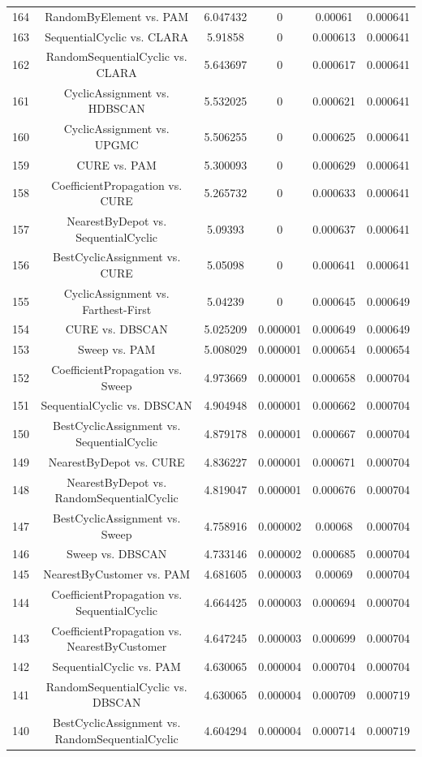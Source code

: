 \documentclass[a4paper,10pt]{article}
\begin{document}
\begin{landscape}
\begin{table}[!htp]
\begin{tabular}{cccccc}
164&RandomByElement vs. PAM&6.047432&0&0.00061&0.000641\\
163&SequentialCyclic vs. CLARA&5.91858&0&0.000613&0.000641\\
162&RandomSequentialCyclic vs. CLARA&5.643697&0&0.000617&0.000641\\
161&CyclicAssignment vs. HDBSCAN&5.532025&0&0.000621&0.000641\\
160&CyclicAssignment vs. UPGMC&5.506255&0&0.000625&0.000641\\
159&CURE vs. PAM&5.300093&0&0.000629&0.000641\\
158&CoefficientPropagation vs. CURE&5.265732&0&0.000633&0.000641\\
157&NearestByDepot vs. SequentialCyclic&5.09393&0&0.000637&0.000641\\
156&BestCyclicAssignment vs. CURE&5.05098&0&0.000641&0.000641\\
155&CyclicAssignment vs. Farthest-First&5.04239&0&0.000645&0.000649\\
154&CURE vs. DBSCAN&5.025209&0.000001&0.000649&0.000649\\
153&Sweep vs. PAM&5.008029&0.000001&0.000654&0.000654\\
152&CoefficientPropagation vs. Sweep&4.973669&0.000001&0.000658&0.000704\\
151&SequentialCyclic vs. DBSCAN&4.904948&0.000001&0.000662&0.000704\\
150&BestCyclicAssignment vs. SequentialCyclic&4.879178&0.000001&0.000667&0.000704\\
149&NearestByDepot vs. CURE&4.836227&0.000001&0.000671&0.000704\\
148&NearestByDepot vs. RandomSequentialCyclic&4.819047&0.000001&0.000676&0.000704\\
147&BestCyclicAssignment vs. Sweep&4.758916&0.000002&0.00068&0.000704\\
146&Sweep vs. DBSCAN&4.733146&0.000002&0.000685&0.000704\\
145&NearestByCustomer vs. PAM&4.681605&0.000003&0.00069&0.000704\\
144&CoefficientPropagation vs. SequentialCyclic&4.664425&0.000003&0.000694&0.000704\\
143&CoefficientPropagation vs. NearestByCustomer&4.647245&0.000003&0.000699&0.000704\\
142&SequentialCyclic vs. PAM&4.630065&0.000004&0.000704&0.000704\\
141&RandomSequentialCyclic vs. DBSCAN&4.630065&0.000004&0.000709&0.000719\\
140&BestCyclicAssignment vs. RandomSequentialCyclic&4.604294&0.000004&0.000714&0.000719\\

\end{tabular}
\end{table}
\end{landscape}
\end{document}

